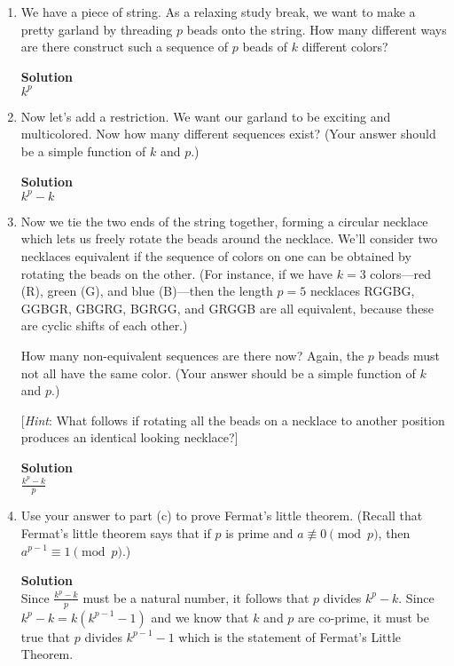 \documentclass[11pt]{article}
\newenvironment{Parts}{\begin{enumerate}[label=(\alph*)]}{\end{enumerate}}
\newcommand*{\Part}{\item}
\newenvironment{Answer}{\vspace{10pt}\begin{mdframed}\textbf{Solution}\\}{\end{mdframed}\vfill\pagebreak[3]}
\newenvironment{Answer}{\vspace{10pt}}{\vfill\pagebreak[3]}
\begin{document}
  \begin{Parts}

    \Part We have a piece of string. As a relaxing study break, we want to make a
    pretty garland by threading $p$ beads onto the string.
    How many different ways are there construct such a sequence of $p$ beads of $k$ different colors?
    \begin{Answer}
    $k^p$
    \end{Answer}

    \Part Now let's add a restriction.  We want our garland to be exciting and multicolored. Now
    how many different sequences exist?
    (Your answer should be a simple function of $k$ and $p$.)
    \begin{Answer}
    $k^p-k$
    \end{Answer}

    \Part Now we tie the two ends of the string together, forming a circular
    necklace which lets us freely rotate the beads around the necklace.
    We'll consider two necklaces equivalent if the sequence of colors on one
    can be obtained by rotating the beads on the other.
    (For instance, if we have $k=3$ colors---red (R), green (G), and
    blue (B)---then the length $p = 5$ necklaces RGGBG, GGBGR, GBGRG, BGRGG, and GRGGB are all
    equivalent, because these are cyclic shifts of each other.)

    How many non-equivalent sequences are there now? Again, the $p$
    beads must not all have the same color.
    (Your answer should be a simple function of $k$ and $p$.)

    [\textit{Hint}: What follows if rotating all the beads on a necklace to another
      position produces an identical looking necklace?]
    \begin{Answer}
    $\frac{k^p-k}{p}$
    \end{Answer}

    \Part Use your answer to part (c) to prove Fermat's little theorem.
    (Recall that Fermat's little theorem says that if $p$ is prime and
    $a \not\equiv 0 \pmod p$, then $a^{p-1} \equiv 1 \pmod p$.)
    \begin{Answer}
    Since $\frac{k^p-k}{p}$ must be a natural number, it follows that $p$ divides $k^p-k$. Since $k^p-k=k(k^{p-1}-1)$ and we know that $k$ and $p$ are co-prime, it must be true that $p$ divides $k^{p-1}-1$ which is the statement of Fermat's Little Theorem.
    \end{Answer}

    \end{Parts}

\end{document}
